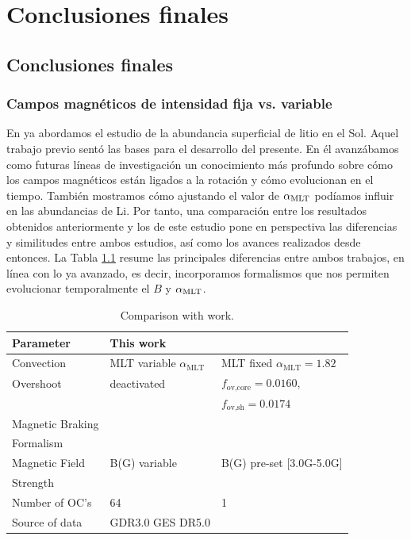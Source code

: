 
\chapter{Conclusiones finales}\label{ch:septimo-capitulo}

\section{Conclusiones finales}
\subsection{Campos magnéticos de intensidad fija vs. variable}
En \cite{Caballero2020} ya abordamos el estudio de la abundancia superficial de litio en el Sol. Aquel trabajo previo sentó las bases para el desarrollo del presente. En él avanzábamos como futuras líneas de investigación un conocimiento más profundo sobre cómo los campos magnéticos están ligados a la rotación y cómo evolucionan en el tiempo. También mostramos cómo ajustando el valor de $\alpha_{\mathrm{MLT}}$ podíamos influir en las abundancias de Li. Por tanto, una comparación entre los resultados obtenidos anteriormente y los de este estudio pone en perspectiva las diferencias y similitudes entre ambos estudios, así como los avances realizados desde entonces. La Tabla \ref{tab:caballero2023_2020} resume las principales diferencias entre ambos trabajos, en línea con lo ya avanzado, es decir, incorporamos formalismos que nos permiten evolucionar temporalmente el $B$ y $\alpha_{\mathrm{MLT}}$.\par 

\begin{table}
	\centering
	\begin{threeparttable}
		\begin{tabular}{lll} 
			\hline
			Parameter & This work & \cite{Caballero2020}\\
			\hline
			Convection & MLT variable $\alpha_{\textrm{MLT}}$ & MLT fixed $\alpha_{\textrm{MLT}}=1.82$\\
			Overshoot & deactivated & $f_{\textrm{ov,core}}=0.0160$,\\ & & $f_{\textrm{ov,sh}}=0.0174$\\
			Magnetic Braking & \cite{Gallet2013} & \cite{Ud-Doula2008} \\ Formalism & & \\
			Magnetic Field & B(G) variable & B(G) pre-set [3.0G-5.0G]\\ Strength & & \\
			Number of OC's & 64 & 1 \\
			Source of data & GDR3.0 GES DR5.0 & \cite{Sestito2005} \\
			\hline
		\end{tabular}
	\end{threeparttable}
	\caption{Comparison with \cite{Caballero2020} work.}
	\label{tab:caballero2023_2020}
\end{table}

